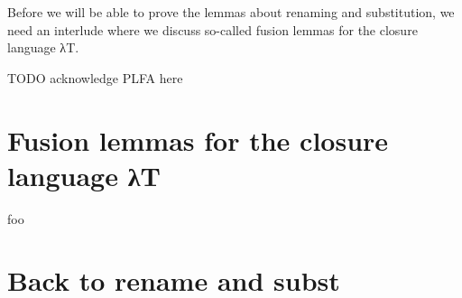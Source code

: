 Before we will be able to prove the lemmas about renaming and substitution, we need an interlude
where we discuss so-called fusion lemmas for the closure language λT.

TODO acknowledge PLFA here


\section{Fusion lemmas for the closure language λT}


foo


\section{Back to \ti rename and \ti subst}

